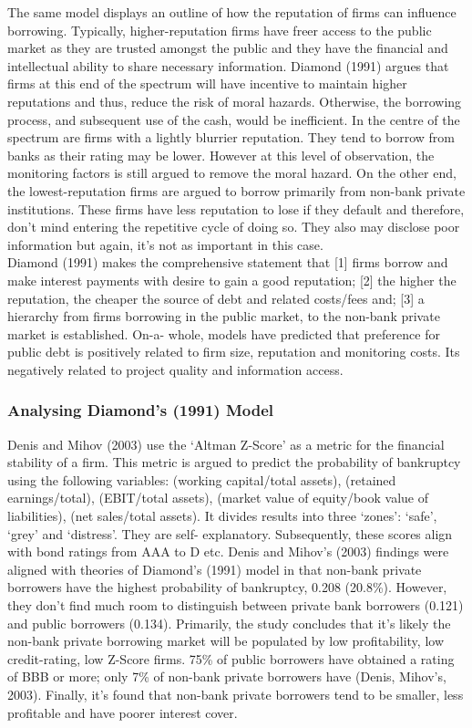 \documentclass[11pt, english]{article}
\begin{document}
	The same model displays an outline of how the reputation of firms can influence borrowing. Typically, higher-reputation firms have freer access to the public market as they are trusted amongst the public and they have the financial and intellectual ability to share necessary information. Diamond (1991) argues that firms at this end of the spectrum will have incentive to maintain higher reputations and thus, reduce the risk of moral hazards. Otherwise, the borrowing process, and subsequent use of the cash, would be inefficient. In the centre of the spectrum are firms with a lightly blurrier reputation. They tend to borrow from banks as their rating may be lower. However at this level of observation, the monitoring factors is still argued to remove the moral hazard. On the other end, the lowest-reputation firms are argued to borrow primarily from non-bank private institutions. These firms have less reputation to lose if they default and therefore, don’t mind entering the repetitive cycle of doing so. They also may disclose poor information but again, it’s not as important in this case.\\

	Diamond (1991) makes the comprehensive statement that [1] firms borrow and make interest payments with desire to gain a good reputation; [2] the higher the reputation, the cheaper the source of debt and related costs/fees and; [3] a hierarchy from firms borrowing in the public market, to the non-bank private market is established. On-a- whole, models have predicted that preference for public debt is positively related to firm size, reputation and monitoring costs. Its negatively related to project quality and information access.

		\subsubsection*{Analysing Diamond's (1991) Model}

	Denis and Mihov (2003) use the ‘Altman Z-Score’ as a metric for the financial stability of a firm. This metric is argued to predict the probability of bankruptcy using the following variables: (working capital/total assets), (retained earnings/total), (EBIT/total assets), (market value of equity/book value of liabilities), (net sales/total assets). It divides results into three ‘zones’: ‘safe’, ‘grey’ and ‘distress’. They are self- explanatory. Subsequently, these scores align with bond ratings from AAA to D etc. Denis and Mihov’s (2003) findings were aligned with theories of Diamond’s (1991) model in that non-bank private borrowers have the highest probability of bankruptcy, 0.208 (20.8\%). However, they don’t find much room to distinguish between private bank borrowers (0.121) and public borrowers (0.134). Primarily, the study concludes that it’s likely the non-bank private borrowing market will be populated by low profitability, low credit-rating, low Z-Score firms. 75\% of public borrowers have obtained a rating of BBB or more; only 7\% of non-bank private borrowers have (Denis, Mihov’s, 2003). Finally, it’s found that non-bank private borrowers tend to be smaller, less profitable and have poorer interest cover.\\
\end{document}
